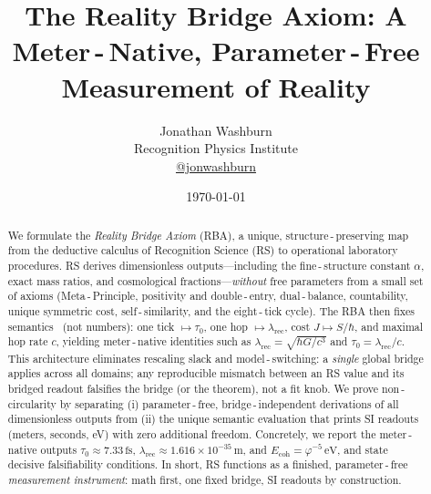 \documentclass[11pt]{article}
\title{\textbf{The Reality Bridge Axiom: A Meter\,\mbox{-}\,Native, Parameter\,\mbox{-}\,Free Measurement of Reality}}
\author{Jonathan Washburn \\
\small Recognition Physics Institute \\
\small \href{https://twitter.com/jonwashburn}{@jonwashburn}}
\date{\today}
\newcommand{\ph}{\varphi}
\newcommand{\lamrec}{\lambda_{\mathrm{rec}}}
\newcommand{\tauzero}{\tau_{0}}
\newcommand{\Ecoh}{E_{\mathrm{coh}}}
\begin{document}
\maketitle

\begin{abstract}
\noindent
We formulate the \emph{Reality Bridge Axiom} (RBA), a unique, structure\,\mbox{-}\,preserving map from the deductive calculus of Recognition Science (RS) to
operational laboratory procedures. RS derives dimensionless outputs---including the fine\,\mbox{-}\,structure constant $\alpha$, exact mass ratios, and cosmological fractions---\emph{without} free parameters from a small set of axioms (Meta\,\mbox{-}\,Principle, positivity and double\,\mbox{-}\,entry, dual\,\mbox{-}\,balance, countability, unique symmetric cost, self\,\mbox{-}\,similarity, and the eight\,\mbox{-}\,tick cycle). The RBA then fixes semantics \
(not numbers): one tick $\mapsto \tauzero$, one hop $\mapsto \lamrec$, cost $J \mapsto S/\hbar$, and maximal hop rate $c$, yielding meter\,\mbox{-}\,native identities such as $\lamrec = \sqrt{\hbar G/c^{3}}$ and $\tauzero = \lamrec/c$. This architecture eliminates rescaling slack and model\,\mbox{-}\,switching: a \emph{single} global bridge applies across all domains; any reproducible mismatch between an RS value and its bridged readout falsifies the bridge (or the theorem), not a fit knob. We prove non\,\mbox{-}\,circularity by separating (i) parameter\,\mbox{-}\,free, bridge\,\mbox{-}\,independent derivations of all dimensionless outputs from (ii) the unique semantic evaluation that prints SI readouts (meters, seconds, eV) with zero additional freedom. Concretely, we report the meter\,\mbox{-}\,native outputs $\tauzero \approx 7.33\,\mathrm{fs}$, $\lamrec \approx 1.616\times 10^{-35}\,\mathrm{m}$, and $\Ecoh = \ph^{-5}\,\mathrm{eV}$, and state decisive falsifiability conditions. In short, RS functions as a finished, parameter\,\mbox{-}\,free \emph{measurement instrument}: math first, one fixed bridge, SI readouts by construction.
\end{abstract}

\end{document}
